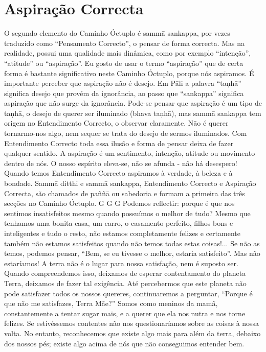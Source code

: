 \section{Aspiração Correcta}

O segundo elemento do Caminho Óctuplo é sammā
sankappa, por vezes traduzido como “Pensamento Correcto”,
o pensar de forma correcta. Mas na realidade, possui uma
qualidade mais dinâmica, como por exemplo “intenção”,
“atitude” ou “aspiração”. Eu gosto de usar o termo “aspiração”
que de certa forma é bastante significativo neste Caminho
Óctuplo, porque nós aspiramos.
É importante perceber que aspiração não é desejo. Em
Pāli a palavra “taṇhā” significa desejo que provém da
ignorância, ao passo que “sankappa” significa aspiração que
não surge da ignorância. Pode-se pensar que aspiração é um
tipo de taṇhā, o desejo de querer ser iluminado (bhava taṇhā),
mas sammā sankappa tem origem no Entendimento Correcto,
o observar claramente. Não é querer tornarmo-nos algo, nem
sequer se trata do desejo de sermos iluminados. Com
Entendimento Correcto toda essa ilusão e forma de pensar
deixa de fazer qualquer sentido.
A aspiração é um sentimento, intenção, atitude ou movimento dentro de nós. O nosso espírito eleva-se, não se afunda - não há desespero! Quando temos Entendimento Correcto
aspiramos à verdade, à beleza e à bondade. Sammā ditthi e
sammā sankappa, Entendimento Correcto e Aspiração
Correcta, são chamados de paññā ou sabedoria e formam a
primeira das três secções no Caminho Óctuplo.
G G G
Podemos reflectir: porque é que nos sentimos insatisfeitos
mesmo quando possuímos o melhor de tudo? Mesmo que
tenhamos uma bonita casa, um carro, o casamento perfeito,
filhos bons e inteligentes e tudo o resto, não estamos
completamente felizes e certamente também não estamos
satisfeitos quando não temos todas estas coisas!... Se não as
temos, podemos pensar, “Bem, se eu tivesse o melhor, estaria
satisfeito”. Mas não estaríamos! A terra não é o lugar para
nossa satisfação, nem é suposto ser. Quando compreendemos
isso, deixamos de esperar contentamento do planeta Terra,
deixamos de fazer tal exigência.
Até percebermos que este planeta não pode satisfazer
todos os nossos quereres, continuaremos a perguntar, “Porque
é que não me satisfazes, Terra Mãe?” Somos como meninos
da mamã, constantemente a tentar sugar mais, e a querer que
ela nos nutra e nos torne felizes.
Se estivéssemos contentes não nos questionaríamos
sobre as coisas à nossa volta. No entanto, reconhecemos que
existe algo mais para além da terra, debaixo dos nossos pés;
existe algo acima de nós que não conseguimos entender bem.
